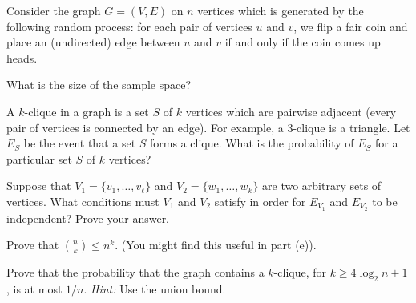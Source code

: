 \documentclass[11pt]{article}
\begin{document}

Consider the graph $G = (V,E)$ on $n$ vertices which is generated by the following random process: for each pair of vertices $u$ and $v$, we flip a fair coin and place an (undirected) edge between $u$ and $v$ if and only if the coin comes up heads.

\begin{Parts}
\Part What is the size of the sample space?

\Part A $k$-clique in a graph is a set $S$ of $k$ vertices which are pairwise adjacent (every pair of vertices is connected by an edge). For example, a $3$-clique is a triangle. Let $E_S$ be the event that a set $S$ forms a clique. What is the probability of $E_S$ for a particular set $S$ of $k$ vertices? 

\Part Suppose that $V_1 = \{v_1, \dots, v_{\ell}\}$ and $V_2 = \{w_1, \dots, w_k\}$ are two arbitrary sets of vertices. What conditions must $V_1$ and $V_2$ satisfy in order for $E_{V_1}$ and $E_{V_2}$ to be independent? Prove your answer.

\Part Prove that $\binom{n}{k} \le n^k$. (You might find this useful in part (e)).

\Part Prove that the probability that the graph contains a $k$-clique, for $k \geq 4{\log_2 n}+1$, is at most $1/n$. \textit{Hint:} Use the union bound.
\end{Parts}

\end{document}
